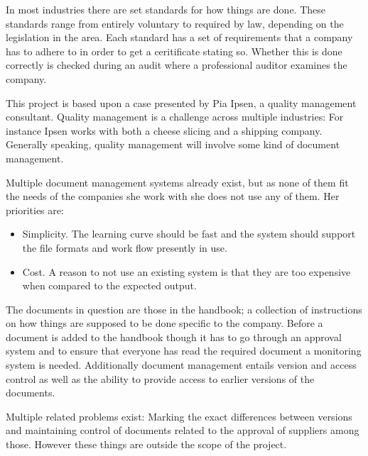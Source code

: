 In most industries there are set standards for how things are done.
These standards range from  entirely voluntary to required by law, depending on the legislation in the area.
Each standard has a set of requirements that a company has to adhere to in order to get a ceritificate stating so.
Whether this is done correctly is checked during an audit where a professional auditor examines the company.

This project is based upon a case presented by Pia Ipsen, a quality management consultant.
Quality management is a challenge across multiple industries: For instance Ipsen works with both a cheese slicing and a shipping company.
Generally speaking, quality management will involve some kind of document management.

Multiple document management systems already exist, but as none of them fit the needs of the companies she work with she does not use any of them.
Her priorities are:

\begin{itemize}
\item Simplicity. The learning curve should be fast and the system should support the file formats and work flow presently in use.
\item Cost. A reason to not use an existing system is that they are too expensive when compared to the expected output.
\end{itemize}

The documents in question are those in the handbook; a collection of instructions on how things are supposed to be done specific to the company.
Before a document is added to the handbook though it has to go through an approval system and to ensure that everyone has read the required document a monitoring system is needed.
Additionally document management entails version and access control as well as the ability to provide access to earlier versions of the documents.

Multiple related problems exist: Marking the exact differences between versions and maintaining control of documents related to the approval of suppliers among those.
However these things are outside the scope of the project.



